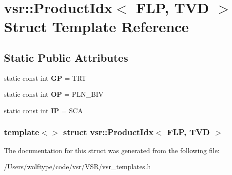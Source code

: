\hypertarget{structvsr_1_1_product_idx_3_01_f_l_p_00_01_t_v_d_01_4}{\section{vsr\-:\-:Product\-Idx$<$ F\-L\-P, T\-V\-D $>$ Struct Template Reference}
\label{structvsr_1_1_product_idx_3_01_f_l_p_00_01_t_v_d_01_4}
}
\subsection*{Static Public Attributes}
\begin{DoxyCompactItemize}
\item 
\hypertarget{structvsr_1_1_product_idx_3_01_f_l_p_00_01_t_v_d_01_4_aae30f5a934bd8986580cd134e5ebff9d}{static const int {\bfseries G\-P} = T\-R\-T}\label{structvsr_1_1_product_idx_3_01_f_l_p_00_01_t_v_d_01_4_aae30f5a934bd8986580cd134e5ebff9d}

\item 
\hypertarget{structvsr_1_1_product_idx_3_01_f_l_p_00_01_t_v_d_01_4_a536e2ff79c14c3ab97081cdcac835eeb}{static const int {\bfseries O\-P} = P\-L\-N\-\_\-\-B\-I\-V}\label{structvsr_1_1_product_idx_3_01_f_l_p_00_01_t_v_d_01_4_a536e2ff79c14c3ab97081cdcac835eeb}

\item 
\hypertarget{structvsr_1_1_product_idx_3_01_f_l_p_00_01_t_v_d_01_4_a86ed7ac2049fc8322c1ccbeac75f4c9c}{static const int {\bfseries I\-P} = S\-C\-A}\label{structvsr_1_1_product_idx_3_01_f_l_p_00_01_t_v_d_01_4_a86ed7ac2049fc8322c1ccbeac75f4c9c}

\end{DoxyCompactItemize}
\subsubsection*{template$<$$>$ struct vsr\-::\-Product\-Idx$<$ F\-L\-P, T\-V\-D $>$}



The documentation for this struct was generated from the following file\-:\begin{DoxyCompactItemize}
\item 
/\-Users/wolftype/code/vsr/\-V\-S\-R/vsr\-\_\-templates.\-h\end{DoxyCompactItemize}
